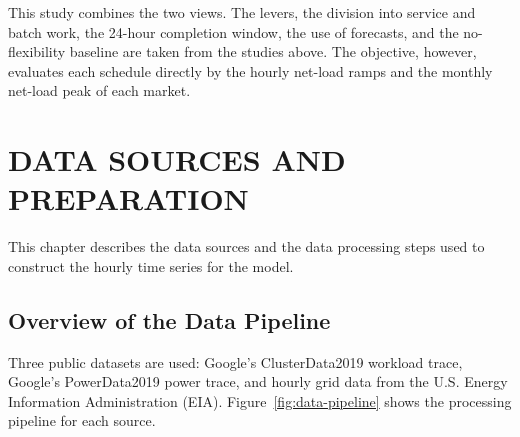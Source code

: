 \documentclass{UNCC-thesis}
\begin{document}
This study combines the two views. The levers, the division into service and batch work, the
24-hour completion window, the use of forecasts, and the no-flexibility baseline are taken from
the studies above. The objective, however, evaluates each schedule directly by the hourly
net-load ramps and the monthly net-load peak of each market.

\chapter{DATA SOURCES AND PREPARATION}
\label{chap:data}

This chapter describes the data sources and the data processing steps used to construct the
hourly time series for the model.

\section{Overview of the Data Pipeline}
\label{sec:data-overview}

Three public datasets are used: Google's ClusterData2019 workload trace,
Google's PowerData2019 power trace, and hourly grid data from the U.S.
Energy Information Administration (EIA). Figure~\ref{fig:data-pipeline} shows
the processing pipeline for each source.
\end{document}
